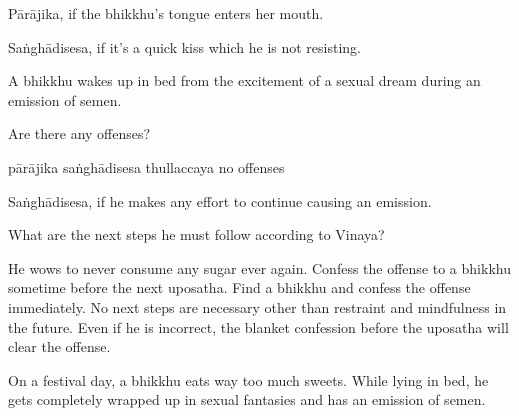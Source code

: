 \begin{exam}{\autoExamName}
\begin{problem}
\begin{solution}
    Pārājika, if the bhikkhu's tongue enters her mouth.

    Saṅghādisesa, if it's a quick kiss which he is not resisting.
  \end{solution}

\end{problem}

\problemDivide

\begin{problem*}
  A bhikkhu wakes up in bed from the excitement of a sexual dream during an emission of semen.

  \begin{parts}

  \item Are there any offenses?

  \bigskip

  \begin{answers}{4}
    \bChoices
     pārājika\eAns
     saṅghādisesa\eAns
     thullaccaya\eAns
     no offenses\eAns
    \eChoices
  \end{answers}

  \begin{solution}
    Saṅghādisesa, if he makes any effort to continue causing an emission.
  \end{solution}

  \bigskip

  \item What are the next steps he must follow according to Vinaya?

  \begin{manswers}{1}
    \bChoices
     He wows to never consume any sugar ever again.\eAns
     Confess the offense to a bhikkhu sometime before the next uposatha.\eAns
     Find a bhikkhu and confess the offense immediately.\eAns
     No next steps are necessary other than restraint and mindfulness in the future. Even if he is incorrect, the blanket confession before the uposatha will clear the offense.\eAns
    \eChoices
  \end{manswers}

  \end{parts}

\end{problem*}

\problemDivide

\begin{problem*}
  On a festival day, a bhikkhu eats way too much sweets.
  While lying in bed, he gets completely wrapped up in sexual fantasies and has an emission of semen.


\end{problem*}
\end{exam}
